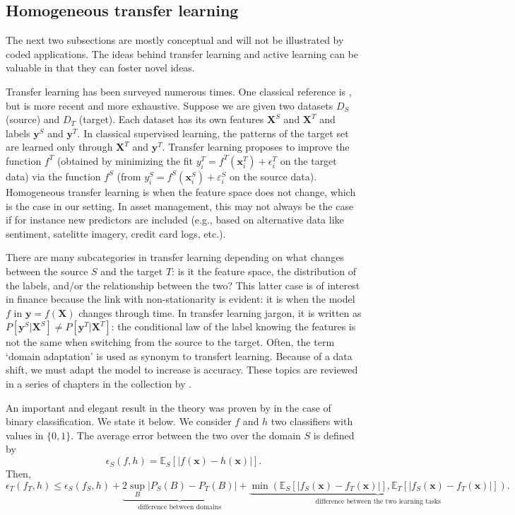 \documentclass[]{krantz}
\theoremstyle{definition}
\theoremstyle{definition}
\theoremstyle{definition}
\theoremstyle{remark}
\begin{document}
\hypertarget{homogeneous-transfer-learning}{%
\subsection{Homogeneous transfer
learning}\label{homogeneous-transfer-learning}}

The next two subsections are mostly conceptual and will not be
illustrated by coded applications. The ideas behind transfer learning
and active learning can be valuable in that they can foster novel ideas.

Transfer learning has been surveyed numerous times. One classical
reference is \citet{pan2009survey}, but \citet{weiss2016survey} is more
recent and more exhaustive. Suppose we are given two datasets \(D_S\)
(source) and \(D_T\) (target). Each dataset has its own features
\(\textbf{X}^S\) and \(\textbf{X}^T\) and labels \(\textbf{y}^S\) and
\(\textbf{y}^T\). In classical supervised learning, the patterns of the
target set are learned only through \(\textbf{X}^T\) and
\(\textbf{y}^T\). Transfer learning proposes to improve the function
\(f^T\) (obtained by minimizing the fit
\(y_i^T=f^T(\textbf{x}_i^T)+\epsilon^T_i\) on the target data) via the
function \(f^S\) (from \(y_i^S=f^S(\textbf{x}_i^S)+\varepsilon^S_i\) on
the source data). Homogeneous transfer learning is when the feature
space does not change, which is the case in our setting. In asset
management, this may not always be the case if for instance new
predictors are included (e.g., based on alternative data like sentiment,
satelitte imagery, credit card logs, etc.).

There are many subcategories in transfer learning depending on what
changes between the source \(S\) and the target \(T\): is it the feature
space, the distribution of the labels, and/or the relationship between
the two? This latter case is of interest in finance because the link
with non-stationarity is evident: it is when the model \(f\) in
\(\textbf{y}=f(\textbf{X})\) changes through time. In transfer learning
jargon, it is written as
\(P[\textbf{y}^S|\textbf{X}^S]\neq P[\textbf{y}^T|\textbf{X}^T]\): the
conditional law of the label knowing the features is not the same when
switching from the source to the target. Often, the term `domain
adaptation' is used as synonym to transfert learning. Because of a data
shift, we must adapt the model to increase is accuracy. These topics are
reviewed in a series of chapters in the collection by
\citet{quionero2009dataset}.

An important and elegant result in the theory was proven by
\citet{ben2010theory} in the case of binary classification. We state it
below. We consider \(f\) and \(h\) two classifiers with values in
\(\{0,1 \}\). The average error between the two over the domain \(S\) is
defined by
\[\epsilon_S(f,h)=\mathbb{E}_S[|f(\textbf{x})-h(\textbf{x})|].\] Then,
\[\epsilon_T(f_T,h)\le \epsilon_S(f_S,h)+\underbrace{2 \sup_B|P_S(B)-P_T(B)|}_{\text{ difference between domains }} + \underbrace{ \min\left(\mathbb{E}_S[|f_S(\textbf{x})-f_T(\textbf{x})|],\mathbb{E}_T[|f_S(\textbf{x})-f_T(\textbf{x})|]\right)}_{\text{difference between the two learning tasks}}.\]
\end{document}
